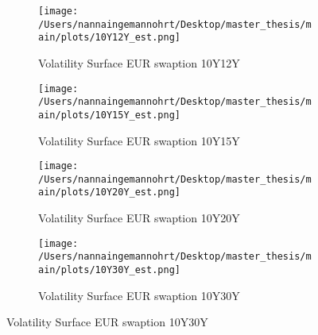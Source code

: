 \begin{figure}[htbp]
    \begin{subfigure}{0.43\textwidth}
        \texttt{[image: /Users/nannaingemannohrt/Desktop/master\_thesis/main/plots/10Y12Y\_est.png]}
        \caption{Volatility Surface EUR swaption 10Y12Y}
        \label{fig:10Y12Y_}
    \end{subfigure}\hfill
    \begin{subfigure}{0.43\textwidth}
        \texttt{[image: /Users/nannaingemannohrt/Desktop/master\_thesis/main/plots/10Y15Y\_est.png]}
        \caption{Volatility Surface EUR swaption 10Y15Y}
        \label{fig:10Y15Y_}
    \end{subfigure}
    \begin{subfigure}{0.43\textwidth}
        \texttt{[image: /Users/nannaingemannohrt/Desktop/master\_thesis/main/plots/10Y20Y\_est.png]}
        \caption{Volatility Surface EUR swaption 10Y20Y}
        \label{fig:10Y20Y_}
    \end{subfigure}\hfill
    \begin{subfigure}{0.43\textwidth}
        \texttt{[image: /Users/nannaingemannohrt/Desktop/master\_thesis/main/plots/10Y30Y\_est.png]}
        \caption{Volatility Surface EUR swaption 10Y30Y}
        \label{fig:10Y30Y_}
    \end{subfigure}

\end{figure}   